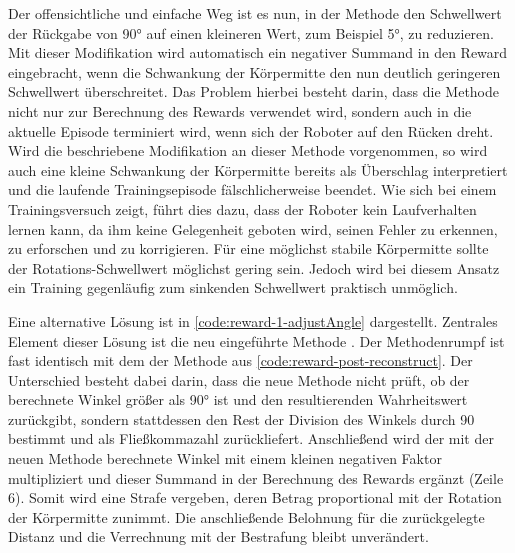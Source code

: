 Der offensichtliche und einfache Weg ist es nun, in der Methode  den Schwellwert der Rückgabe von 90° auf einen kleineren Wert, zum Beispiel 5°, zu reduzieren.
Mit dieser Modifikation wird automatisch ein negativer Summand in den Reward eingebracht, wenn die Schwankung der Körpermitte den nun deutlich geringeren Schwellwert überschreitet.
Das Problem hierbei besteht darin, dass die Methode  nicht nur zur Berechnung des Rewards verwendet wird, sondern auch in  die aktuelle Episode terminiert wird, wenn sich der Roboter auf den Rücken dreht.
Wird die beschriebene Modifikation an dieser Methode vorgenommen, so wird auch eine kleine Schwankung der Körpermitte bereits als Überschlag interpretiert und die laufende Trainingsepisode fälschlicherweise beendet.
Wie sich bei einem Trainingsversuch zeigt, führt dies dazu, dass der Roboter kein Laufverhalten lernen kann, da ihm keine Gelegenheit geboten wird, seinen Fehler zu erkennen, zu erforschen und zu korrigieren.
Für eine möglichst stabile Körpermitte sollte der Rotations-Schwellwert möglichst gering sein.
Jedoch wird bei diesem Ansatz ein Training gegenläufig zum sinkenden Schwellwert praktisch unmöglich.

\begin{figure}
    
\end{figure}

Eine alternative Lösung ist in \autoref{code:reward-1-adjustAngle} dargestellt.
Zentrales Element dieser Lösung ist die neu eingeführte Methode .
Der Methodenrumpf ist fast identisch mit dem der Methode  aus \autoref{code:reward-post-reconstruct}.
Der Unterschied besteht dabei darin, dass die neue Methode nicht prüft, ob der berechnete Winkel größer als 90° ist und den resultierenden Wahrheitswert zurückgibt, sondern stattdessen den Rest der Division des Winkels durch 90 bestimmt und als Fließkommazahl zurückliefert.
Anschließend wird der mit der neuen Methode berechnete Winkel mit einem kleinen negativen Faktor multipliziert und dieser Summand in der Berechnung des Rewards ergänzt (Zeile 6).
Somit wird eine Strafe vergeben, deren Betrag proportional mit der Rotation der Körpermitte zunimmt.
Die anschließende Belohnung für die zurückgelegte Distanz und die Verrechnung mit der Bestrafung bleibt unverändert.

